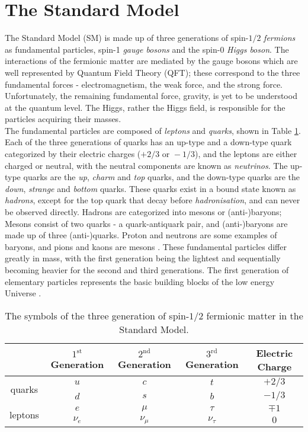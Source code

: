 
\section{The Standard Model}
The Standard Model (SM) is made up of three generations of spin-$1/2$ \textit{fermions} as fundamental particles, spin-1 \textit{gauge bosons} and the spin-0 \textit{Higgs boson}. The interactions of the fermionic matter are mediated by the gauge bosons which are well represented by Quantum Field Theory (QFT); these correspond to the three fundamental forces - electromagnetism, the weak force, and the strong force. Unfortunately, the remaining fundamental force, gravity, is yet to be understood at the quantum level. The Higgs, rather the Higgs field, is responsible for the particles acquiring their masses. \\

The fundamental particles are composed of \textit{leptons} and \textit{quarks}, shown in Table \ref{tab:SMFerm}. Each of the three generations of quarks has an up-type and a down-type quark categorized by their electric charges ($+2/3 \text{ or } -1/3$), and the leptons are either charged or neutral, with the neutral components are known as \textit{neutrinos}. The up-type quarks are the \textit{up}, \textit{charm} and \textit{top} quarks, and the down-type quarks are the \textit{down}, \textit{strange} and \textit{bottom} quarks. These quarks exist in a bound state known as \textit{hadrons}, except for the top quark that decay before \textit{hadronisation}, and can never be observed directly. Hadrons are categorized into mesons or (anti-)baryons; Mesons consist of two quarks - a quark-antiquark pair, and (anti-)baryons are made up of three (anti-)quarks. Proton and neutrons are some examples of baryons, and pions and kaons are mesons \cite{thomson2013modern}. These fundamental particles differ greatly in mass, with the first generation being the lightest and sequentially becoming heavier for the second and third generations. The first generation of elementary particles represents the basic building blocks of the low energy Universe \cite{thomson2013modern}. \\

\begin{table}[htbp]
    \centering
    \begin{tabular}{c||c|c|c|c}
    \toprule
    & $1^{\text{st}}$ Generation & $2^{\text{nd}}$ Generation & $3^{\text{rd}}$ Generation & Electric Charge \\
    \midrule
    \multirow{2}{1.2cm}{quarks} & $u$ & $c$ & $t$ & $+2/3$ \\
     & $d$ & $s$ & $b$ & $-1/3$ \\
    \midrule
    \multirow{2}{1.2cm}{leptons} & $e$ & $\mu$ & $\tau$ & $\mp1$ \\
     & $\nu_e$ & $\nu_\mu$ & $\nu_\tau$ & $0$ \\
    \bottomrule
    \end{tabular}
    \caption{The symbols of the three generation of spin-$1/2$ fermionic matter in the Standard Model.}
    \label{tab:SMFerm}
\end{table}


